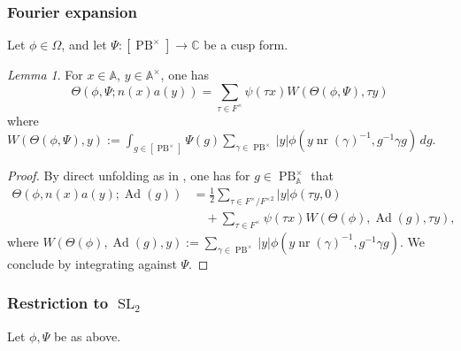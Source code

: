 \documentclass[reqno,10pt]{amsart}
\theoremstyle{plain} %
\theoremstyle{definition}
\theoremstyle{plain} %
\theoremstyle{remark}
\theoremstyle{itplain} %
\newtheorem*{lemma*}{Lemma}
\theoremstyle{remark} %
\numberwithin{equation}{section}
\DeclareMathOperator{\SL}{SL}
\DeclareMathOperator{\Ad}{Ad}
\def\PB{\operatorname{PB}}
\DeclareMathOperator{\nr}{nr}
\begin{document}
\subsubsection{Fourier expansion}\label{sec:four-expans}
Let $\phi \in \Omega$, and let $\Psi : [\PB^\times] \rightarrow \mathbb{C}$ be a cusp form.
\begin{lemma*}%
  For $x \in \mathbb{A}$, $y \in \mathbb{A}^\times$, one has
  \[
    \Theta(\phi,\Psi;n(x) a(y)) = \sum_{\tau \in F^\times} \psi(\tau x) W(\Theta(\phi,\Psi), \tau y)
  \]
  where $W(\Theta(\phi,\Psi),y) := \int_{g \in [\PB^\times]} \Psi(g) \sum_{\gamma \in \PB^\times} |y| \phi(y \nr(\gamma)^{-1}, g^{-1} \gamma g) \,d g$.
\end{lemma*}
\begin{proof}
  By direct unfolding as in \cite{MR0333081}, one has for $g \in \PB^\times_{\mathbb{A}}$ that
  \begin{equation*}
    \begin{split}
      \Theta(\phi, n(x) a(y);\Ad(g)) &= \frac{1}{2} \sum_{\tau \in F^\times / F^{\times 2}}
      |y| \phi(\tau y,0) \\
      &\quad + \sum_{\tau \in F^\times} \psi(\tau x) W(\Theta(\phi),\Ad(g),\tau y),
    \end{split}
  \end{equation*}
  where $W(\Theta(\phi),\Ad(g),y) := \sum_{\gamma \in \PB^\times} |y| \phi(y \nr(\gamma)^{-1}, g^{-1} \gamma g)$.  We conclude by integrating against $\Psi$.
\end{proof}


\subsubsection{Restriction to $\SL_2$}\label{sec:35ac3e570e}
Let $\phi, \Psi$ be as above.
\end{document}
